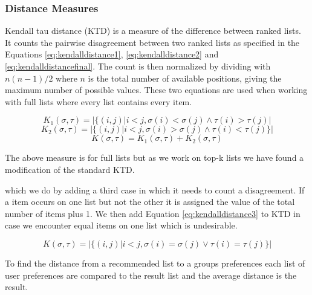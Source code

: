 \subsubsection{Distance Measures}\label{sec:distance}
Kendall tau distance (KTD) is a measure of the difference between ranked lists\citep{rank:aggregation}. It counts the pairwise disagreement between two ranked lists as specified in the Equations \ref{eq:kendalldistance1}, \ref{eq:kendalldistance2} and \ref{eq:kendalldistancefinal}. The count is then normalized by dividing with $n(n-1)/2$ where $n$ is the total number of available positions, giving the maximum number of possible values. 
These two equations are used when working with full lists where every list contains every item. 

\begin{equation}\label{eq:kendalldistance1}
K_1(\sigma,\tau) = | \{(i,j) | i < j, \sigma (i) < \sigma (j) \land \tau (i) > \tau (j)|
\end{equation}
\begin{equation}\label{eq:kendalldistance2}
K_2(\sigma,\tau) = | \{(i,j) | i < j, \sigma (i) > \sigma (j) \land \tau (i) < \tau (j) \} |
\end{equation}
\begin{equation}\label{eq:kendalldistancefinal}
K(\sigma,\tau) = K_1(\sigma,\tau) + K_2(\sigma,\tau)
\end{equation}

The above measure is for full lists but as we work on top-k lists we have found a modification of the standard KTD\cite{comparing:topk}. 

 which we do by adding a third case in which it needs to count a disagreement. If a item occurs on one list but not the other it is assigned the value of the total number of items plus 1. We then add Equation \ref{eq:kendalldistance3} to KTD in case we encounter equal items on one list which is undesirable.

\begin{equation}\label{eq:kendalldistance3}
K(\sigma,\tau) = | \{(i,j) | i < j, \sigma (i) = \sigma (j) \lor \tau (i) = \tau (j) \} |
\end{equation}

To find the distance from a recommended list to a groups preferences each list of user preferences are compared to the result list and the average distance is the result. 



